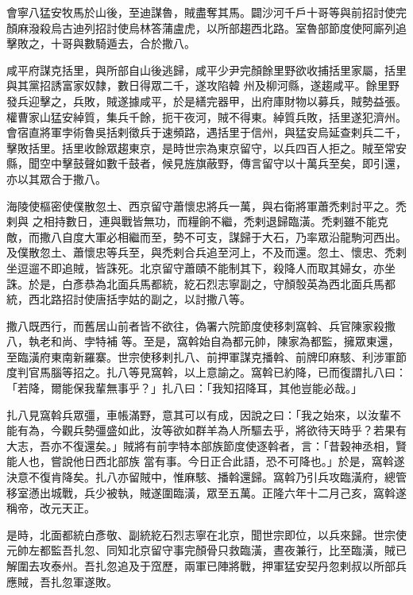 \begin{pinyinscope}
 會寧八猛安牧馬於山後，至迪謀魯，賊盡奪其馬。闢沙河千戶十哥等與前招討使完顏麻潑殺烏古迪列招討使烏林答蒲盧虎，以所部趨西北路。室魯部節度使阿廝列追擊敗之，十哥與數騎遁去，合於撒八。



 咸平府謀克括里，與所部自山後逃歸，咸平少尹完顏餘里野欲收捕括里家屬，括里與其黨招誘富家奴隸，數日得眾二千，遂攻陷韓
 州及柳河縣，遂趨咸平。餘里野發兵迎擊之，兵敗，賊遂據咸平，於是繕完器甲，出府庫財物以募兵，賊勢益張。權曹家山猛安綽質，集兵千餘，扼干夜河，賊不得東。綽質兵敗，括里遂犯濟州。會宿直將軍孛術魯吳括剌徵兵于速頻路，遇括里于信州，與猛安烏延查剌兵二千，擊敗括里。括里收餘眾趨東京，是時世宗為東京留守，以兵四百人拒之。賊至常安縣，聞空中擊鼓聲如數千鼓者，候見旌旗蔽野，傳言留守以十萬兵至矣，即引還，亦以其眾合于撒八。



 海陵使樞密使僕散忽土、西京留守蕭懷忠將兵一萬，與右衛將軍蕭禿剌討平之。禿剌與
 之相持數日，連與戰皆無功，而糧餉不繼，禿剌退歸臨潢。禿剌雖不能克敵，而撒八自度大軍必相繼而至，勢不可支，謀歸于大石，乃率眾沿龍駒河西出。及僕散忽土、蕭懷忠等兵至，與禿剌合兵追至河上，不及而還。忽土、懷忠、禿剌坐逗遛不即追賊，皆誅死。北京留守蕭賾不能制其下，殺降人而取其婦女，亦坐誅。於是，白彥恭為北面兵馬都統，紇石烈志寧副之，守顏彀英為西北面兵馬都統，西北路招討使唐括孛姑的副之，以討撒八等。



 撒八既西行，而舊居山前者皆不欲往，偽署六院節度使移刺窩斡、兵官陳家殺撒八，執老和尚、孛特補
 等。至是，窩斡始自為都元帥，陳家為都監，擁眾東還，至臨潢府東南新羅寨。世宗使移剌扎八、前押軍謀克播斡、前牌印麻駭、利涉軍節度判官馬腦等招之。扎八等見窩斡，以上意諭之。窩斡已約降，已而復謂扎八曰：「若降，爾能保我輩無事乎？」扎八曰：「我知招降耳，其他豈能必哉。」



 扎八見窩斡兵眾彊，車帳滿野，意其可以有成，因說之曰：「我之始來，以汝輩不能有為，今觀兵勢彊盛如此，汝等欲如群羊為人所驅去乎，將欲待天時乎？若果有大志，吾亦不復還矣。」賊將有前孛特本部族節度使逐斡者，言：「昔穀神丞相，賢能人也，嘗說他日西北部族
 當有事。今日正合此語，恐不可降也。」於是，窩斡遂決意不復肯降矣。扎八亦留賊中，惟麻駭、播斡還歸。窩斡乃引兵攻臨潢府，總管移室懣出城戰，兵少被執，賊遂圍臨潢，眾至五萬。正隆六年十二月己亥，窩斡遂稱帝，改元天正。



 是時，北面都統白彥敬、副統紇石烈志寧在北京，聞世宗即位，以兵來歸。世宗使元帥左都監吾扎忽、同知北京留守事完顏骨只救臨潢，晝夜兼行，比至臨潢，賊已解圍去攻泰州。吾扎忽追及于窊歷，兩軍已陣將戰，押軍猛安契丹忽剌叔以所部兵應賊，吾扎忽軍遂敗。




\end{pinyinscope}
